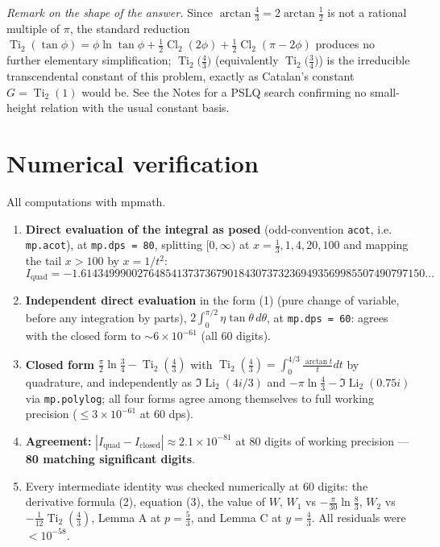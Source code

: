 \documentclass[11pt]{article}
\theoremstyle{remark}
\begin{document}
\textit{Remark on the shape of the answer.} Since $\arctan\frac43=2\arctan\frac12$ is not a rational multiple of $\pi$, the standard reduction $\operatorname{Ti}_2(\tan\phi)=\phi\ln\tan\phi+\frac12\operatorname{Cl}_2(2\phi)+\frac12\operatorname{Cl}_2(\pi-2\phi)$ produces no further elementary simplification; $\operatorname{Ti}_2\!\big(\frac43\big)$ (equivalently $\operatorname{Ti}_2\!\big(\frac34\big)$) is the irreducible transcendental constant of this problem, exactly as Catalan's constant $G=\operatorname{Ti}_2(1)$ would be. See the Notes for a PSLQ search confirming no small-height relation with the usual constant basis.

\section*{Numerical verification}

All computations with mpmath.

\begin{enumerate}
\item \textbf{Direct evaluation of the integral as posed} (odd-convention \texttt{acot}, i.e. \texttt{mp.acot}), at \texttt{mp.dps = 80}, splitting $[0,\infty)$ at $x=\frac13,1,4,20,100$ and mapping the tail $x>100$ by $x=1/t^2$:
\[I_{\text{quad}}=-1.6143499900276485413737367901843073732369493569985507490797150\ldots\]
\item \textbf{Independent direct evaluation} in the form (1) (pure change of variable, before any integration by parts), $2\int_0^{\pi/2}\eta\tan\theta\,d\theta$, at \texttt{mp.dps = 60}: agrees with the closed form to $\sim6\times10^{-61}$ (all 60 digits).
\item \textbf{Closed form} $\frac\pi2\ln\frac34-\operatorname{Ti}_2(\frac43)$ with $\operatorname{Ti}_2(\frac43)=\int_0^{4/3}\frac{\arctan t}{t}dt$ by quadrature, and independently as $\Im\operatorname{Li}_2(4i/3)$ and $-\pi\ln\frac43-\Im\operatorname{Li}_2(0.75i)$ via \texttt{mp.polylog}; all four forms agree among themselves to full working precision ($\le3\times10^{-61}$ at 60 dps).
\item \textbf{Agreement:} $|I_{\text{quad}}-I_{\text{closed}}|\approx2.1\times10^{-81}$ at 80 digits of working precision --- \textbf{80 matching significant digits}.
\item Every intermediate identity was checked numerically at 60 digits: the derivative formula (2), equation (3), the value of $W$, $W_1$ vs $-\frac{\pi}{30}\ln\frac83$, $W_2$ vs $-\frac1{12}\operatorname{Ti}_2(\frac43)$, Lemma A at $p=\frac53$, and Lemma C at $y=\frac43$. All residuals were $<10^{-58}$.
\end{enumerate}
\end{document}
